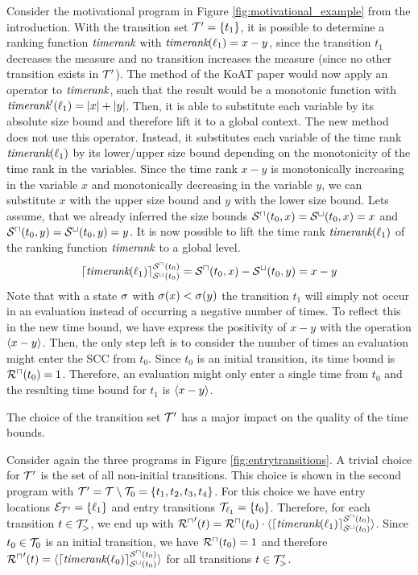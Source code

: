 \begin{example}[TimeBounds]
  
  Consider the motivational program in Figure \ref{fig:motivational_example} from the introduction.
  With the transition set $\mathcal{T}' = \lbrace t_1 \rbrace$, it is possible to determine a ranking function $\emph{timerank}$ with $\emph{timerank}(\ell_1) = x - y$, since the transition $t_1$ decreases the measure and no transition increases the measure (since no other transition exists in $\mathcal{T}'$).
  The method of the KoAT paper \cite{koat} would now apply an operator to $\emph{timerank}$, such that the result would be a monotonic function with $\emph{timerank}'(\ell_1) = \left|x\right| + \left|y\right|$.
  Then, it is able to substitute each variable by its absolute size bound and therefore lift it to a global context.
  The new method does not use this operator.
  Instead, it substitutes each variable of the time rank $\emph{timerank}(\ell_1)$ by its lower/upper size bound depending on the monotonicity of the time rank in the variables.
  Since the time rank $x-y$ is monotonically increasing in the variable $x$ and monotonically decreasing in the variable $y$, we can substitute $x$ with the upper size bound and $y$ with the lower size bound.
  Lets assume, that we already inferred the size bounds ${\mathcal{S}^\sqcap}(t_0,x) = {\mathcal{S}^\sqcup}(t_0,x) = x$ and ${\mathcal{S}^\sqcap}(t_0,y) = {\mathcal{S}^\sqcup}(t_0,y) = y$.
  It is now possible to lift the time rank $\emph{timerank}(\ell_1)$ of the ranking function $\emph{timerank}$ to a global level.
  \[ \lceil \emph{timerank}(\ell_1) \rceil^{{\mathcal{S}^\sqcap}(t_0)}_{{\mathcal{S}^\sqcup}(t_0)} = {\mathcal{S}^\sqcap}(t_0, x) - {\mathcal{S}^\sqcup}(t_0, y) = x - y \]
  Note that with a state $\sigma$ with $\sigma(x) < \sigma(y)$ the transition $t_1$ will simply not occur in an evaluation instead of occurring a negative number of times.
  To reflect this in the new time bound, we have express the positivity of $x - y$ with the operation $\langle x - y\rangle$.
  Then, the only step left is to consider the number of times an evaluation might enter the SCC from $t_0$.
  Since $t_0$ is an initial transition, its time bound is ${\mathcal{R}^\sqcap}(t_0) = 1$.
  Therefore, an evaluation might only enter a single time from $t_0$ and the resulting time bound for $t_1$ is $\langle x - y\rangle$.
\end{example}

The choice of the transition set $\mathcal{T}'$ has a major impact on the quality of the time bounds.

Consider again the three programs in Figure \ref{fig:entrytransitions}.
A trivial choice for $\mathcal{T}'$ is the set of all non-initial transitions.
This choice is shown in the second program with $\mathcal{T}' = \mathcal{T} \setminus \mathcal{T}_0 = \lbrace t_1, t_2, t_3, t_4 \rbrace$.
For this choice we have entry locations $\mathcal{E}_{\mathcal{T}'} = \lbrace \ell_1 \rbrace$ and entry transitions $\mathcal{T}_{\ell_1} = \lbrace t_0 \rbrace$.
Therefore, for each transition $t \in \mathcal{T}'_>$, we end up with ${\mathcal{R}^\sqcap}'(t) = {\mathcal{R}^\sqcap}(t_0) \cdot \langle\lceil \emph{timerank}(\ell_1) \rceil^{{\mathcal{S}^\sqcap}(t_0)}_{{\mathcal{S}^\sqcup}(t_0)}\rangle$.
Since $t_0 \in \mathcal{T}_0$ is an initial transition, we have ${\mathcal{R}^\sqcap}(t_0) = 1$ and therefore ${\mathcal{R}^\sqcap}'(t) = \langle\lceil \emph{timerank}(\ell_0) \rceil^{{\mathcal{S}^\sqcap}(t_0)}_{{\mathcal{S}^\sqcup}(t_0)}\rangle$ for all transitions $t \in \mathcal{T}'_>$.

